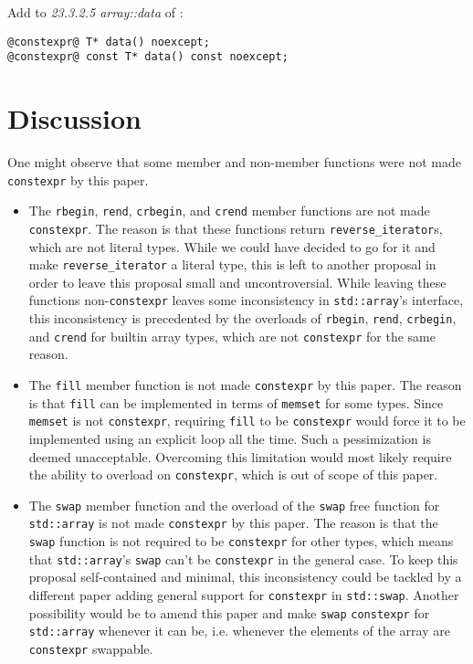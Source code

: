 \documentclass[11pt]{article}
\begin{document}
Add to \emph{23.3.2.5 array::data} of \cite{N4296}:

\begin{lstlisting}[style=base]
@constexpr@ T* data() noexcept;
@constexpr@ const T* data() const noexcept;
\end{lstlisting}


\section{Discussion}
One might observe that some member and non-member functions were not made {\tt constexpr}
by this paper.

\begin{itemize}
    \item The {\tt rbegin}, {\tt rend}, {\tt crbegin}, and {\tt crend} member functions
          are not made {\tt constexpr}. The reason is that these functions return
          {\tt reverse\_iterator}s, which are not literal types. While we could have
          decided to go for it and make {\tt reverse\_iterator} a literal type, this is
          left to another proposal in order to leave this proposal small and uncontroversial.
          While leaving these functions non-{\tt constexpr} leaves some inconsistency in
          {\tt std::array}'s interface, this inconsistency is precedented by the overloads
          of {\tt rbegin}, {\tt rend}, {\tt crbegin}, and {\tt crend} for builtin array
          types, which are not {\tt constexpr} for the same reason.

    \item The {\tt fill} member function is not made {\tt constexpr} by this paper. The reason
          is that {\tt fill} can be implemented in terms of {\tt memset} for some types. Since
          {\tt memset} is not {\tt constexpr}, requiring {\tt fill} to be {\tt constexpr} would
          force it to be implemented using an explicit loop all the time. Such a pessimization
          is deemed unacceptable. Overcoming this limitation would most likely require the
          ability to overload on {\tt constexpr}, which is out of scope of this paper.

    \item The {\tt swap} member function and the overload of the {\tt swap} free function
          for {\tt std::array} is not made {\tt constexpr} by this paper. The reason is that
          the {\tt swap} function is not required to be {\tt constexpr} for other types,
          which means that {\tt std::array}'s {\tt swap} can't be {\tt constexpr} in the
          general case. To keep this proposal self-contained and minimal, this inconsistency
          could be tackled by a different paper adding general support for {\tt constexpr} in
          {\tt std::swap}. Another possibility would be to amend this paper and make
          {\tt swap} {\tt constexpr} for {\tt std::array} whenever it can be, i.e. whenever
          the elements of the array are {\tt constexpr} swappable.
\end{itemize}
\end{document}
